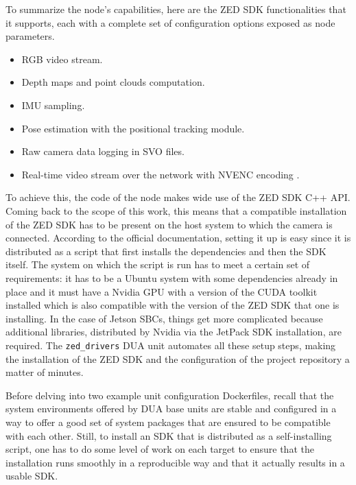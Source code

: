To summarize the node's capabilities, here are the ZED SDK functionalities that it supports, each with a complete set of configuration options exposed as node parameters.
\begin{itemize}
  \item RGB video stream.
  \item Depth maps and point clouds computation.
  \item IMU sampling.
  \item Pose estimation with the positional tracking module.
  \item Raw camera data logging in SVO files.
  \item Real-time video stream over the network with NVENC encoding \cite{nvidia_nvidia_nodate-1}.
\end{itemize}
To achieve this, the code of the node makes wide use of the ZED SDK C++ API. Coming back to the scope of this work, this means that a compatible installation of the ZED SDK has to be present on the host system to which the camera is connected. According to the official documentation, setting it up is easy since it is distributed as a script that first installs the dependencies and then the SDK itself. The system on which the script is run has to meet a certain set of requirements: it has to be a Ubuntu \cite{canonical_ubuntu_nodate} system with some dependencies already in place and it must have a Nvidia GPU with a version of the CUDA toolkit \cite{nvidia_cuda_nodate-1} installed which is also compatible with the version of the ZED SDK that one is installing. In the case of Jetson SBCs, things get more complicated because additional libraries, distributed by Nvidia via the JetPack SDK installation, are required. The \texttt{zed\_drivers} DUA unit automates all these setup steps, making the installation of the ZED SDK and the configuration of the project repository a matter of minutes.

Before delving into two example unit configuration Dockerfiles, recall that the system environments offered by DUA base units are stable and configured in a way to offer a good set of system packages that are ensured to be compatible with each other. Still, to install an SDK that is distributed as a self-installing script, one has to do some level of work on each target to ensure that the installation runs smoothly in a reproducible way and that it actually results in a usable SDK.

